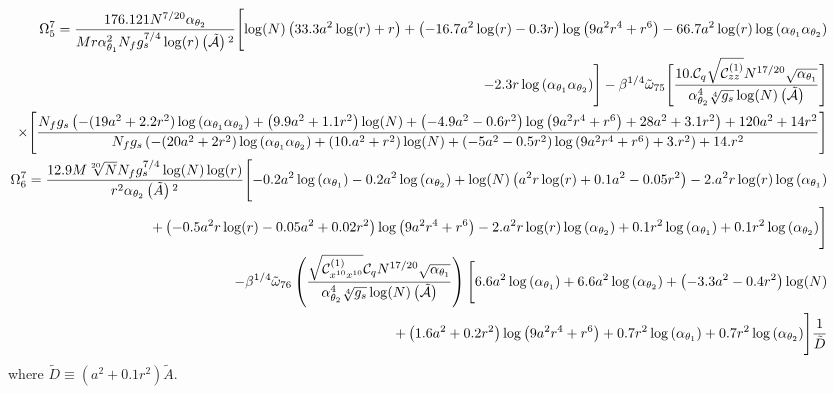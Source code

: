 \documentclass[a4paper,11pt,fleqn]{article}
\theoremstyle{plain}
\theoremstyle{definition}
\begin{document}
{\scriptsize
\begin{eqnarray}
   & &\hskip -0.5in \Omega^7_5=\frac{176.121 N^{7/20} \alpha _{\theta_2}}{M r \alpha _{\theta_1}^2 N_f g_s^{7/4} \log (r) \left(\tilde{\cal A}\right){}^2} \Biggl[\log (N) \left(33.3 a^2 \log (r)+ r\right)+\left(-16.7 a^2 \log (r)-0.3 r\right) \log \left(9 a^2 r^4+r^6\right)-66.7 a^2 \log (r) \log \left(\alpha _{\theta_1}\alpha
   _{\theta_2}\right) \nonumber\\
  & &\hskip -0.5in -2.3 r \log \left(\alpha _{\theta_1}\alpha _{\theta_2}\right)\Biggr]  -\beta^{1/4}\tilde{\omega}_{75}\Biggl[\frac{10. {\cal C}_q \sqrt{{\cal C}_{zz}^{(1)}} N^{17/20} \sqrt{\alpha _{\theta_1}}}{\alpha _{\theta_2}^4 \sqrt[4]{g_s} \log (N) \left(\tilde{\cal A}\right)} \Biggr]
    \nonumber\\
   & &\hskip -0.5in \times \Biggl[\frac{N_f g_s \left(-({19} a^2 + 2.2 r^2)\log \left(\alpha_{\theta_1}\alpha _{\theta_2}\right)+\left({9.9}
   a^2+{1.1} r^2\right) \log (N)+\left(-{4.9} a^2-{0.6} r^2\right) \log \left(9 a^2 r^4+r^6\right)+{28} a^2+{3.1} r^2\right)+{120} a^2+{14} r^2}{N_f g_s \left(-(20 a^2 + 2 r^2) \log \left(\alpha _{\theta_1}\alpha _{\theta
   _2}\right)+\left(10. a^2+r^2\right) \log (N)+\left(-5 a^2-0.5 r^2\right) \log \left(9 a^2 r^4+r^6\right)+3. r^2\right)+14. r^2}\Biggr] \nonumber\\
& & \hskip -0.5in \Omega^7_6=\frac{12.9 M \sqrt[20]{N} N_f g_s^{7/4} \log (N) \log (r)}{r^2 \alpha _{\theta_2} \left(\tilde{A}\right){}^2} \Biggl[-0.2 a^2 \log \left(\alpha _{\theta_1}\right)-0.2 a^2 \log \left(\alpha _{\theta_2}\right)+\log (N) \left(a^2 r \log (r)+0.1 a^2-0.05 r^2\right)-2. a^2 r \log (r) \log \left(\alpha _{\theta_1}\right)\nonumber\\
& & \hskip -0.5in +\left(-0.5 a^2 r \log (r)-0.05 a^2+0.02 r^2\right) \log \left(9 a^2
   r^4+r^6\right)-2. a^2 r \log (r) \log \left(\alpha _{\theta_2}\right)+0.1 r^2 \log \left(\alpha _{\theta_1}\right)+0.1 r^2 \log \left(\alpha _{\theta_2}\right)\Biggr] \nonumber\\
   & & \hskip -0.5in - \beta^{1/4}\tilde{\omega}_{76}\left(\frac{\sqrt{{\cal C}_{x^{10}x^{10}}^{(1)}} {\cal C}_q N^{17/20} \sqrt{\alpha _{\theta_1}}}{\alpha _{\theta_2}^4 \sqrt[4]{g_s} \log (N) \left(\tilde{\cal A}\right)}\right) \Biggl[{6.6} a^2 \log \left(\alpha _{\theta_1}\right)+{6.6} a^2 \log \left(\alpha _{\theta_2}\right)+\left(-{3.3}
   a^2-{0.4} r^2\right) \log (N) \nonumber\\
  & & \hskip -0.5in  +\left({1.6} a^2+{0.2} r^2\right) \log \left(9 a^2 r^4+r^6\right)+{0.7} r^2 \log \left(\alpha _{\theta_1}\right)+{0.7} r^2 \log \left(\alpha _{\theta_2}\right)\Biggr]\frac{1}{\tilde{D}}
\end{eqnarray}
}
where $\tilde{D}\equiv(a^2+0.1r^2)\tilde{A}$.
\end{document}
